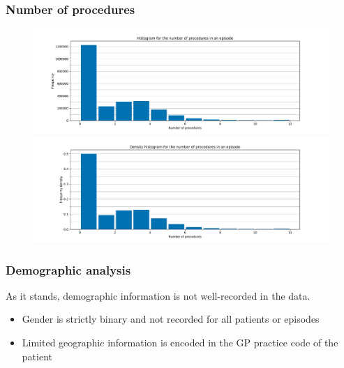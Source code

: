\documentclass{beamer}
\begin{document}
\begin{frame}
    \frametitle{Number of procedures}

    \begin{figure}
        \begin{minipage}{\linewidth}
            \includegraphics[width=\linewidth]{./img/proc_no_freq_hist.pdf}
        \end{minipage}
        \begin{minipage}{\linewidth}
            \includegraphics[width=\linewidth]{./img/proc_no_density_hist.pdf}
        \end{minipage}
    \end{figure}
\end{frame}

\begin{frame}
    \frametitle{Demographic analysis}

    As it stands, demographic information is not well-recorded in the data.

    \vspace{10pt}
    \begin{itemize}
        \pause%
        \item Gender is strictly binary and not recorded for all patients or
            episodes
        \pause%
        \item Limited geographic information is encoded in the GP practice code
            of the patient
    \end{itemize}
\end{frame}
\end{document}
